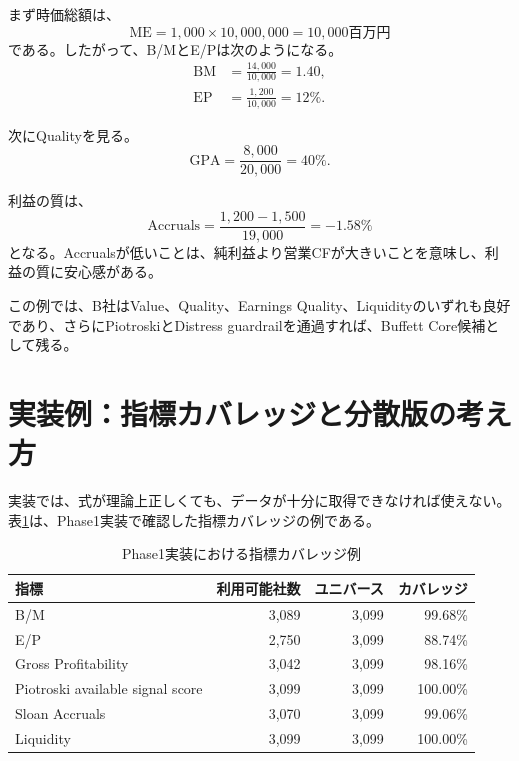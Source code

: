 \documentclass[11pt,a4paper]{article}
\newcommand{\ME}{\mathrm{ME}}
\begin{document}
まず時価総額は、
\begin{equation}
\ME = 1{,}000\times 10{,}000{,}000 = 10{,}000\text{百万円}
\end{equation}
である。したがって、B/MとE/Pは次のようになる。
\begin{align}
\mathrm{BM} &= \frac{14{,}000}{10{,}000}=1.40,\\
\mathrm{EP} &= \frac{1{,}200}{10{,}000}=12\%.
\end{align}

次にQualityを見る。
\begin{equation}
\mathrm{GPA} = \frac{8{,}000}{20{,}000}=40\%.
\end{equation}

利益の質は、
\begin{equation}
\mathrm{Accruals} = \frac{1{,}200-1{,}500}{19{,}000}=-1.58\%
\end{equation}
となる。Accrualsが低いことは、純利益より営業CFが大きいことを意味し、利益の質に安心感がある。

この例では、B社はValue、Quality、Earnings Quality、Liquidityのいずれも良好であり、さらにPiotroskiとDistress guardrailを通過すれば、Buffett Core候補として残る。

\clearpage
\section{実装例：指標カバレッジと分散版の考え方}

実装では、式が理論上正しくても、データが十分に取得できなければ使えない。表\ref{tab:coverage}は、Phase1実装で確認した指標カバレッジの例である。

\begin{table}[tbp]
\caption{Phase1実装における指標カバレッジ例}
\label{tab:coverage}
\centering
\small
\begin{tabular}{lrrr}
\toprule
指標 & 利用可能社数 & ユニバース & カバレッジ \\
\midrule
B/M & 3,089 & 3,099 & 99.68\% \\
E/P & 2,750 & 3,099 & 88.74\% \\
Gross Profitability & 3,042 & 3,099 & 98.16\% \\
Piotroski available signal score & 3,099 & 3,099 & 100.00\% \\
Sloan Accruals & 3,070 & 3,099 & 99.06\% \\
Liquidity & 3,099 & 3,099 & 100.00\% \\
\bottomrule
\end{tabular}
\end{table}
\end{document}
